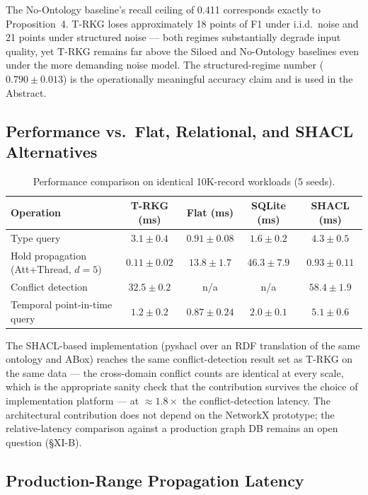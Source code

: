 \documentclass{ieeeaccess}
\begin{document}
The No-Ontology baseline's recall ceiling of 0.411 corresponds exactly to Proposition~4. T-RKG loses approximately 18 points of F1 under i.i.d.\ noise and 21 points under structured noise — both regimes substantially degrade input quality, yet T-RKG remains far above the Siloed and No-Ontology baselines even under the more demanding noise model. The structured-regime number ($0.790 \pm 0.013$) is the operationally meaningful accuracy claim and is used in the Abstract.

\subsection{Performance vs.\ Flat, Relational, and SHACL Alternatives}

\begin{table}[t]
\centering
\caption{Performance comparison on identical 10K-record workloads (5 seeds).}
\label{tab:perf}
\begin{tabular}{lcccc}
\hline\hline
Operation & T-RKG (ms) & Flat (ms) & SQLite (ms) & SHACL (ms) \\
\hline
Type query                            & $3.1 \pm 0.4$  & $0.91 \pm 0.08$ & $1.6 \pm 0.2$ & $4.3 \pm 0.5$ \\
Hold propagation (Att+Thread, $d{=}5$) & $0.11 \pm 0.02$ & $13.8 \pm 1.7$  & $46.3 \pm 7.9$ & $0.93 \pm 0.11$ \\
Conflict detection                    & $32.5 \pm 0.2$ & n/a             & n/a & $58.4 \pm 1.9$ \\
Temporal point-in-time query          & $1.2 \pm 0.2$  & $0.87 \pm 0.24$ & $2.0 \pm 0.1$ & $5.1 \pm 0.6$ \\
\hline\hline
\end{tabular}
\end{table}

The SHACL-based implementation (pyshacl over an RDF translation of the same ontology and ABox) reaches the same conflict-detection result set as T-RKG on the same data — the cross-domain conflict counts are identical at every scale, which is the appropriate sanity check that the contribution survives the choice of implementation platform — at $\approx 1.8\times$ the conflict-detection latency. The architectural contribution does not depend on the NetworkX prototype; the relative-latency comparison against a production graph DB remains an open question (§XI-B).

\subsection{Production-Range Propagation Latency}
\end{document}
